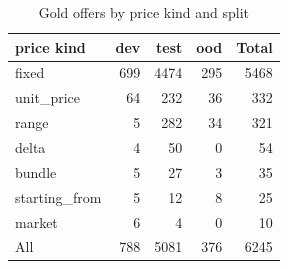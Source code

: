 \begin{table}[t]
\centering
\caption{Gold offers by price kind and split}
\label{tab:pricekind}
\small
\begin{tabular}{lrrrr}
\toprule
price kind & dev & test & ood & Total \\
\midrule
fixed & 699 & 4474 & 295 & 5468 \\
unit\_price & 64 & 232 & 36 & 332 \\
range & 5 & 282 & 34 & 321 \\
delta & 4 & 50 & 0 & 54 \\
bundle & 5 & 27 & 3 & 35 \\
starting\_from & 5 & 12 & 8 & 25 \\
market & 6 & 4 & 0 & 10 \\
All & 788 & 5081 & 376 & 6245 \\
\bottomrule
\end{tabular}
\end{table}
